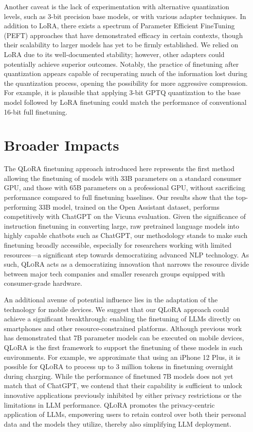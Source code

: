 Another caveat is the lack of experimentation with alternative quantization levels, such as 3-bit precision base models, or with various adapter techniques. In addition to LoRA, there exists a spectrum of Parameter Efficient FineTuning (PEFT) approaches that have demonstrated efficacy in certain contexts, though their scalability to larger models has yet to be firmly established. We relied on LoRA due to its well-documented stability; however, other adapters could potentially achieve superior outcomes. Notably, the practice of finetuning after quantization appears capable of recuperating much of the information lost during the quantization process, opening the possibility for more aggressive compression. For example, it is plausible that applying 3-bit GPTQ quantization to the base model followed by LoRA finetuning could match the performance of conventional 16-bit full finetuning.

\section{Broader Impacts}

The \textsc{QLoRA} finetuning approach introduced here represents the first method allowing the finetuning of models with 33B parameters on a standard consumer GPU, and those with 65B parameters on a professional GPU, without sacrificing performance compared to full finetuning baselines. Our results show that the top-performing 33B model, trained on the Open Assistant dataset, performs competitively with ChatGPT on the Vicuna evaluation. Given the significance of instruction finetuning in converting large, raw pretrained language models into highly capable chatbots such as ChatGPT, our methodology stands to make such finetuning broadly accessible, especially for researchers working with limited resources—a significant step towards democratizing advanced NLP technology. As such, \textsc{QLoRA} acts as a democratizing innovation that narrows the resource divide between major tech companies and smaller research groups equipped with consumer-grade hardware.

An additional avenue of potential influence lies in the adaptation of the technology for mobile devices. We suggest that our \textsc{QLoRA} approach could achieve a significant breakthrough: enabling the finetuning of LLMs directly on smartphones and other resource-constrained platforms. Although previous work has demonstrated that 7B parameter models can be executed on mobile devices, \textsc{QLoRA} is the first framework to support the finetuning of these models in such environments. For example, we approximate that using an iPhone 12 Plus, it is possible for \textsc{QLoRA} to process up to 3 million tokens in finetuning overnight during charging. While the performance of finetuned 7B models does not yet match that of ChatGPT, we contend that their capability is sufficient to unlock innovative applications previously inhibited by either privacy restrictions or the limitations in LLM performance. \textsc{QLoRA} promotes the privacy-centric application of LLMs, empowering users to retain control over both their personal data and the models they utilize, thereby also simplifying LLM deployment.

